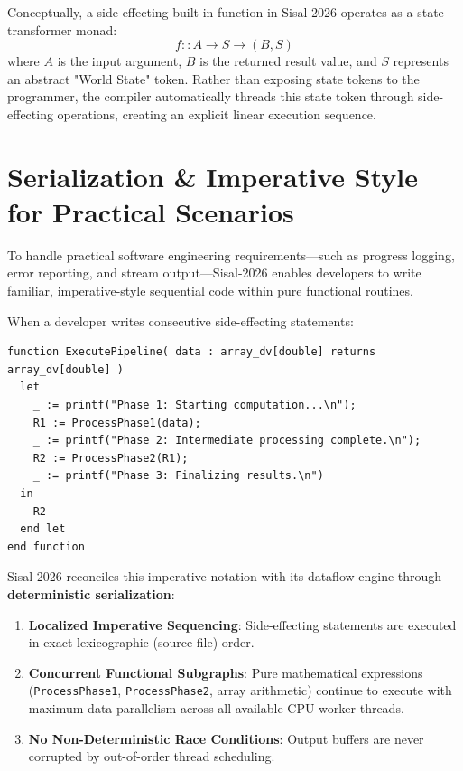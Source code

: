 Conceptually, a side-effecting built-in function in Sisal-2026 operates as a state-transformer monad:
\begin{equation}
f :: A \to S \to (B, S)
\end{equation}
where $A$ is the input argument, $B$ is the returned result value, and $S$ represents an abstract "World State" token. Rather than exposing state tokens to the programmer, the compiler automatically threads this state token through side-effecting operations, creating an explicit linear execution sequence.

\section{Serialization \& Imperative Style for Practical Scenarios}
To handle practical software engineering requirements—such as progress logging, error reporting, and stream output—Sisal-2026 enables developers to write familiar, imperative-style sequential code within pure functional routines.

When a developer writes consecutive side-effecting statements:
\begin{lstlisting}[caption={Imperative-Style Logging Sequence in Sisal-2026}]
function ExecutePipeline( data : array_dv[double] returns array_dv[double] )
  let
    _ := printf("Phase 1: Starting computation...\n");
    R1 := ProcessPhase1(data);
    _ := printf("Phase 2: Intermediate processing complete.\n");
    R2 := ProcessPhase2(R1);
    _ := printf("Phase 3: Finalizing results.\n")
  in
    R2
  end let
end function
\end{lstlisting}

Sisal-2026 reconciles this imperative notation with its dataflow engine through \textbf{deterministic serialization}:
\begin{enumerate}
    \item \textbf{Localized Imperative Sequencing}: Side-effecting statements are executed in exact lexicographic (source file) order.
    \item \textbf{Concurrent Functional Subgraphs}: Pure mathematical expressions (\texttt{ProcessPhase1}, \texttt{ProcessPhase2}, array arithmetic) continue to execute with maximum data parallelism across all available CPU worker threads.
    \item \textbf{No Non-Deterministic Race Conditions}: Output buffers are never corrupted by out-of-order thread scheduling.
\end{enumerate}

